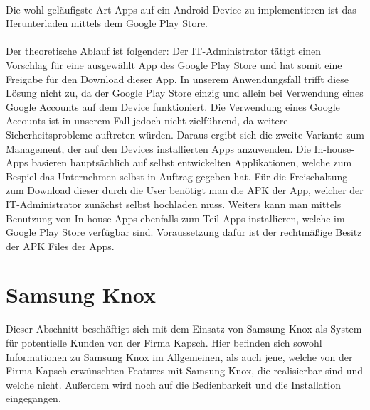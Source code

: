 \paragraph*{}
Die wohl geläufigste Art Apps auf ein Android Device zu implementieren ist das Herunterladen mittels dem Google Play Store.
\paragraph*{}
Der theoretische Ablauf ist folgender: Der IT-Administrator tätigt einen Vorschlag für eine ausgewählt App des Google Play Store und hat somit eine Freigabe für den Download dieser App. In unserem Anwendungsfall trifft diese Lösung nicht zu, da der Google Play Store einzig und allein bei Verwendung eines Google Accounts auf dem Device funktioniert. Die Verwendung eines Google Accounts ist in unserem Fall jedoch nicht zielführend, da weitere Sicherheitsprobleme auftreten würden. Daraus ergibt sich die zweite Variante zum Management, der auf den Devices installierten Apps anzuwenden. Die In-house-Apps basieren hauptsächlich auf selbst entwickelten Applikationen, welche zum Bespiel das Unternehmen selbst in Auftrag gegeben hat. Für die Freischaltung zum Download dieser durch die User benötigt man die APK der App, welcher der IT-Administrator zunächst selbst hochladen muss. Weiters kann man mittels Benutzung von In-house Apps ebenfalls zum Teil Apps installieren, welche im Google Play Store verfügbar sind. Voraussetzung dafür ist der rechtmäßige Besitz der APK Files der Apps.

\newpage
\section{Samsung Knox}
Dieser Abschnitt beschäftigt sich mit dem Einsatz von Samsung Knox als System für potentielle Kunden von der Firma Kapsch. Hier befinden sich sowohl Informationen zu Samsung Knox im Allgemeinen, als auch jene, welche von der Firma Kapsch erwünschten Features mit Samsung Knox, die realisierbar sind und welche nicht. Außerdem wird noch auf die Bedienbarkeit und die Installation eingegangen.
